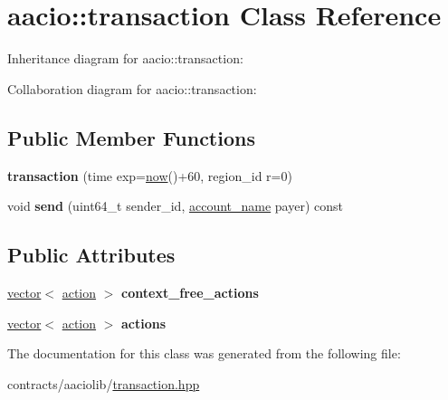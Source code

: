 \hypertarget{classaacio_1_1transaction}{}\section{aacio\+:\+:transaction Class Reference}
\label{classaacio_1_1transaction}


Inheritance diagram for aacio\+:\+:transaction\+:


Collaboration diagram for aacio\+:\+:transaction\+:
\subsection*{Public Member Functions}
\begin{DoxyCompactItemize}
\item 
\mbox{\label{classaacio_1_1transaction_a6d35b1d2806d80949a6a64a537c215af}} 
{\bfseries transaction} (time exp=\mbox{\hyperlink{group__systemcapi_ga5eef43c9589d6ef54a0ece1dda5e0ffe}{now}}()+60, region\+\_\+id r=0)
\item 
\mbox{\label{classaacio_1_1transaction_a022fe231cc8b43d4fd2c8a5451f845bd}} 
void {\bfseries send} (uint64\+\_\+t sender\+\_\+id, \mbox{\hyperlink{structaacio_1_1chain_1_1name}{account\+\_\+name}} payer) const
\end{DoxyCompactItemize}
\subsection*{Public Attributes}
\begin{DoxyCompactItemize}
\item 
\mbox{\label{classaacio_1_1transaction_a531ba3c8e61872145142225cfc35dfc9}} 
\mbox{\hyperlink{classstd_1_1vector}{vector}}$<$ \mbox{\hyperlink{structaacio_1_1action}{action}} $>$ {\bfseries context\+\_\+free\+\_\+actions}
\item 
\mbox{\label{classaacio_1_1transaction_a8ffaaa43d73ee1d8ff496476b69f1842}} 
\mbox{\hyperlink{classstd_1_1vector}{vector}}$<$ \mbox{\hyperlink{structaacio_1_1action}{action}} $>$ {\bfseries actions}
\end{DoxyCompactItemize}


The documentation for this class was generated from the following file\+:\begin{DoxyCompactItemize}
\item 
contracts/aaciolib/\mbox{\hyperlink{contracts_2aaciolib_2transaction_8hpp}{transaction.\+hpp}}\end{DoxyCompactItemize}
